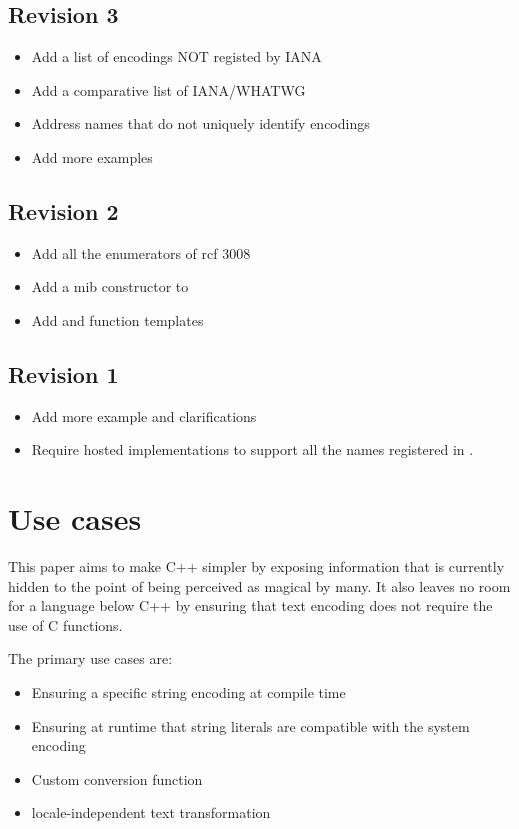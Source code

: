 \documentclass{wg21}
\begin{document}
\subsection*{Revision 3}
\begin{itemize}
    \item Add a list of encodings NOT registed by IANA 
    \item Add a comparative list of IANA/WHATWG
    \item Address names that do not uniquely identify encodings
    \item Add more examples
\end{itemize}

\subsection*{Revision 2}
\begin{itemize}
	\item Add all the enumerators of rcf 3008
    \item Add a mib constructor to 
    \item Add  and  function templates
\end{itemize}

\subsection*{Revision 1}
\begin{itemize}
    \item Add more example and clarifications
    \item Require hosted implementations to support all the names registered in \cite{rfc3808}.
\end{itemize}

\section{Use cases}

This paper aims to make C++ simpler by exposing information that is currently hidden to the point of
being perceived as magical by many.
It also leaves no room for a language below C++ by ensuring that text encoding does not require the use of C functions.

The primary use cases are:

\begin{itemize}
    \item Ensuring a specific string encoding at compile time
    \item Ensuring at runtime that string literals are compatible with the system encoding
    \item Custom conversion function
    \item locale-independent text transformation
\end{itemize}
\end{document}
